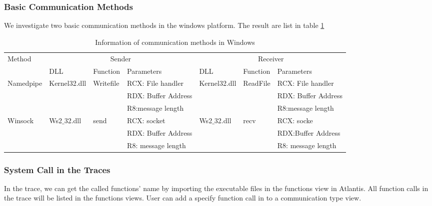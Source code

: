 \documentclass[paper=a4, fontsize=11pt]{scrartcl}
\numberwithin{equation}{section}		%
\numberwithin{figure}{section}			%
\numberwithin{table}{section}				%
\begin{document}
\subsubsection{Basic Communication Methods}
We investigate two basic communication methods in the windows platform. The result are list in table \ref{communicatemethod}
\begin{table}
        \centering
        \caption{Information of communication methods in Windows}
        \label{communicatemethod}
        \begin{tabular}{|l|l|l|l|l|l|l|}
            \hline
             \multirow{2}{*}{Method} &
               \multicolumn{3}{c|}{Sender} &
               \multicolumn{3}{c|}{Receiver} \\
             \cline{2-7}
             &  DLL & Function& Parameters & DLL  & Function & Parameters\\
             \hline
             Namedpipe& Kernel32.dll& Writefile&  RCX: File handler & Kernel32.dll & ReadFile &  RCX: File handler\\
             \cline{4-4} \cline{7-7}
             &&&RDX: Buffer Address&&&RDX: Buffer Address\\
              \cline{4-4} \cline{7-7}
               &&&R8:message length&&&R8:message length\\
               \hline
             Winsock & Ws2$\_$32.dll & send & RCX: socket & Ws2$\_$32.dll & recv & RCX: socke \\
              \cline{4-4} \cline{7-7}
             &&&RDX: Buffer Address&&&RDX:Buffer Address\\
              \cline{4-4} \cline{7-7}
               &&&R8: message length&&&R8: message length\\
            \hline
        \end{tabular}
    \end{table}

\subsubsection{System Call in the Traces}
In the trace, we can get the called functions' name by importing the executable files in the functions view in Atlantis. All function calls in the trace will be listed in the functions views. User can add a specify function call in to a communication type view.
\end{document}
